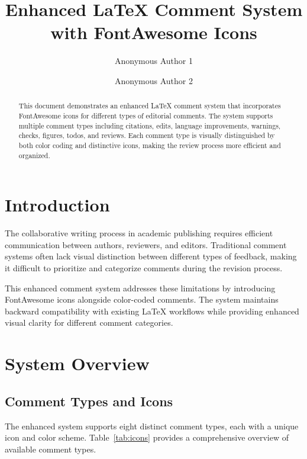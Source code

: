 \documentclass[manuscript]{acmart}
\title{Enhanced LaTeX Comment System with FontAwesome Icons}
\author{Anonymous Author 1}
\affiliation{%
  \institution{Anonymous University}
  \country{Country}
}
\author{Anonymous Author 2}
\affiliation{%
  \institution{Anonymous Research Institute}
  \country{Country}
}
\begin{document}
\begin{abstract}
This document demonstrates an enhanced LaTeX comment system that incorporates FontAwesome icons for different types of editorial comments. The system supports multiple comment types including citations, edits, language improvements, warnings, checks, figures, todos, and reviews. Each comment type is visually distinguished by both color coding and distinctive icons, making the review process more efficient and organized.
\end{abstract}

\maketitle

\section{Introduction}

The collaborative writing process in academic publishing requires efficient communication between authors, reviewers, and editors. Traditional comment systems often lack visual distinction between different types of feedback, making it difficult to prioritize and categorize comments during the revision process.


This enhanced comment system addresses these limitations by introducing FontAwesome icons alongside color-coded comments. The system maintains backward compatibility with existing LaTeX workflows while providing enhanced visual clarity for different comment categories.


\section{System Overview}

\subsection{Comment Types and Icons}

The enhanced system supports eight distinct comment types, each with a unique icon and color scheme. Table~\ref{tab:icons} provides a comprehensive overview of available comment types.
\end{document}
